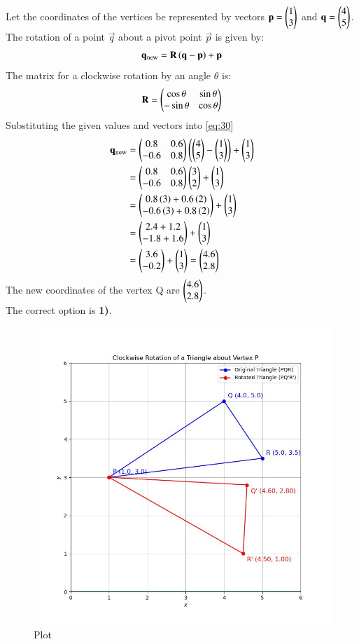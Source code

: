 \documentclass[journal]{IEEEtran}
\begin{document}
Let the coordinates of the vertices be represented by vectors $\mathbf{p} = \begin{pmatrix}1 \\ 3\end{pmatrix}$ and $\mathbf{q} = \begin{pmatrix}4 \\ 5\end{pmatrix}$.
The rotation of a point $\vec{q}$ about a pivot point $\vec{p}$ is given by:
\begin{align}
    \mathbf{q}_{\text{new}} = \mathbf{R}\left(\mathbf{q} - \mathbf{p}\right) + \mathbf{p} \label{eq:30}
\end{align}
The matrix for a clockwise rotation by an angle $\theta$ is:
\begin{align}
    \mathbf{R} = \begin{pmatrix}\cos\theta & \sin\theta \\ -\sin\theta & \cos\theta\end{pmatrix}
\end{align}
Substituting the given values and vectors into \eqref{eq:30}
\begin{align}
    \mathbf{q}_{\text{new}} &= \begin{pmatrix}0.8 & 0.6 \\ -0.6 & 0.8\end{pmatrix}\left(\begin{pmatrix}4 \\ 5\end{pmatrix} - \begin{pmatrix}1 \\ 3\end{pmatrix}\right) + \begin{pmatrix}1 \\ 3\end{pmatrix}  \\
    &= \begin{pmatrix}0.8 & 0.6 \\ -0.6 & 0.8\end{pmatrix}\begin{pmatrix}3 \\ 2\end{pmatrix} + \begin{pmatrix}1 \\ 3\end{pmatrix}  \\
    &= \begin{pmatrix}0.8\left(3\right) + 0.6\left(2\right) \\ -0.6\left(3\right) + 0.8\left(2\right)\end{pmatrix} + \begin{pmatrix}1 \\ 3\end{pmatrix}  \\
    &= \begin{pmatrix}2.4 + 1.2 \\ -1.8 + 1.6\end{pmatrix} + \begin{pmatrix}1 \\ 3\end{pmatrix}  \\
    &= \begin{pmatrix}3.6 \\ -0.2\end{pmatrix} + \begin{pmatrix}1 \\ 3\end{pmatrix} = \begin{pmatrix}4.6 \\ 2.8\end{pmatrix}
\end{align}
The new coordinates of the vertex Q are $\begin{pmatrix}4.6 \\ 2.8\end{pmatrix}$. \\
The correct option is \textbf{1)}.

\begin{figure}[h!]
	\centering
	\includegraphics[width=\columnwidth]{figs/plot_c.jpg}
	\caption*{Plot}
	\label{fig:fig}
\end{figure}
\end{document}
